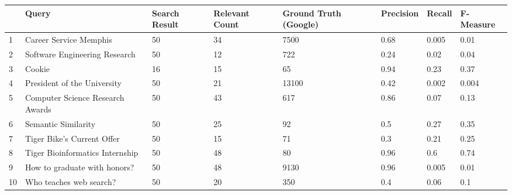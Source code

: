 \begin{center}
 \begin{tabular}{|p{0.5cm}|p{2cm}|p{2cm}|p{2cm}|p{2cm}|p{2cm}|p{2cm}|p{2cm}|}
 \hline
   & \textbf{Query} & \textbf{Search Result} & \textbf{Relevant Count} & \textbf{Ground Truth (Google)} & \textbf{Precision} & \textbf{Recall} & \textbf{F-Measure} \\ [0.5ex]
 \hline\hline
 1 & Career Service Memphis & 50 & 34 & 7500 & 0.68 & 0.005 & 0.01 \\
 \hline
 2 & Software Engineering Research & 50 & 12 & 722 & 0.24 & 0.02 & 0.04 \\
 \hline
 3 & Cookie & 16 & 15 & 65 & 0.94 & 0.23 & 0.37 \\
 \hline
 4 & President of the University & 50 & 21 & 13100 & 0.42 & 0.002 & 0.004 \\
 \hline
 5 & Computer Science Research Awards & 50 & 43 & 617 & 0.86 & 0.07 & 0.13 \\
 \hline
 6 & Semantic Similarity & 50 & 25 & 92 & 0.5 & 0.27 & 0.35 \\
 \hline
 7 & Tiger Bike's Current Offer & 50 & 15 & 71 & 0.3 & 0.21 & 0.25 \\
 \hline
 8 & Tiger Bioinformatics Internship & 50 & 48 & 80 & 0.96 & 0.6 & 0.74 \\
 \hline
 9 & How to graduate with honors? & 50 & 48 & 9130 & 0.96 & 0.005 & 0.01 \\
 \hline
 10 & Who teaches web search? & 50 & 20 & 350 & 0.4 & 0.06 & 0.1 \\
 \hline
\end{tabular}
\end{center}